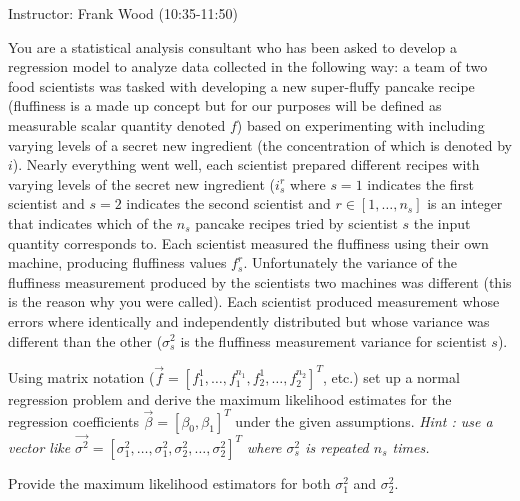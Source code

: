 \documentclass[12pt]{article}
\begin{document}
 \begin{center}
  Instructor: Frank Wood (10:35-11:50) 
 \end{center}
\studentinfo
{}
\finishfirstpage



{
You are a statistical analysis consultant who has been asked to develop a regression model to analyze data collected in the following way:  a team of two food scientists was tasked with developing a new super-fluffy pancake recipe (fluffiness is a made up concept but for our purposes will be defined as measurable scalar quantity denoted $f$) based on experimenting with including varying levels of a secret new ingredient (the concentration of which is denoted by $i$).  Nearly everything went well, each scientist prepared different recipes with varying levels of the secret new ingredient ($i_s^r$ where $s=1$ indicates the first scientist and $s=2$ indicates the second scientist and $r \in [1, \ldots, n_s]$ is an integer that indicates which of the $n_s$ pancake recipes tried by scientist $s$ the input quantity corresponds to.   Each scientist measured the fluffiness using their own machine, producing fluffiness values $f_s^r$.  Unfortunately the variance of the fluffiness measurement produced by the scientists two machines was different (this is the reason why you were called).  Each scientist produced measurement whose errors where identically and independently distributed but whose variance was different than the other ($\sigma^2_s$ is the fluffiness measurement variance for scientist $s$).  

\abcs 
\item Using matrix notation ($\vec f = [f_1^1,\ldots,f_1^{n_1}, f_2^1,\ldots,f_2^{n_2}]^T$, etc.) set up a normal regression problem and derive the maximum likelihood estimates for the regression coefficients $\vec \beta = [\beta_0, \beta_1]^T$ under the given assumptions.  {\em Hint : use a vector like $\vec{\sigma^2} = [\sigma^2_1,\ldots,\sigma^2_1, \sigma^2_2,\ldots,\sigma^2_2]^T$ where $\sigma^2_s$ is repeated $n_s$ times.}
\item Provide the maximum likelihood estimators for both $\sigma^2_1$ and $\sigma^2_2.$
\endabcs
}
{
\vfill
\newpage
}
{
}
\end{document}
